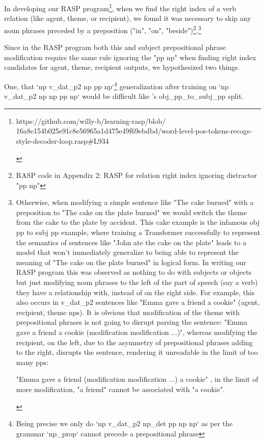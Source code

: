 \documentclass[11pt]{article}
\begin{document}
In developing our RASP program\footnote{\begin{tiny}
https://github.com/willy-b/learning-rasp/blob/
16a8e154b025e91c8e56965a1d475e49f69ebdbd/word-level-pos-tokens-recogs-style-decoder-loop.rasp\#L934
\end{tiny}
},
when we find the right index of a verb relation (like agent, theme, or recipient), 
we found it was necessary to skip any noun phrases preceded by a preposition ("in", "on", "beside")\footnote{RASP code in Appendix 2: RASP for relation right index ignoring distractor "pp np"}.\footnote{
\begin{tiny}
Otherwise, when modifying a simple sentence like "The cake burned" with a preposition to "The cake on the plate burned" we would switch the theme from the cake to the plate by accident.
This cake example is the infamous obj pp to subj pp example, where training a Transformer successfully to represent the semantics of sentences like "John ate the cake on the plate" leads to a model that won't immediately generalize to being able to represent the meaning of "The cake on the plate burned" in logical form.
In writing our RASP program this was observed as nothing to do with subjects or objects but just modifying noun phrases to the left of the part of speech (say a verb) they have a relationship with, instead of on the right side. For example, this also occurs in v\_dat\_p2 sentences like "Emma gave a friend a cookie" (agent, recipient, theme nps). It is obvious that modification of the theme with prepositional phrases is not going to disrupt parsing the sentence: "Emma gave a friend a cookie (modification modification ...)", whereas modifying the recipient, on the left, due to the asymmetry of prepositional phrases adding to the right, disrupts the sentence, rendering it unreadable in the limit of too many pps:

"Emma gave a friend (modification modification ...) a cookie" , in the limit of more modification, "a friend" cannot be associated with "a cookie".
\end{tiny}}

Since in the RASP program both this and subject prepositional phrase modification require the same rule ignoring the "pp np" when finding right index candidates for agent, theme, recipient outputs, we hypothesized two things.

One, that `np v\_dat\_p2 np pp np`\footnote{Being precise we only do `np v\_dat\_p2 np\_det pp np np` as per the grammar `np\_prop` cannot precede a prepositional phrase} generalization after training on `np v\_dat\_p2 np np pp np` would be difficult like \cite{Wu2023}'s obj\_pp\_to\_subj\_pp split.
\end{document}
